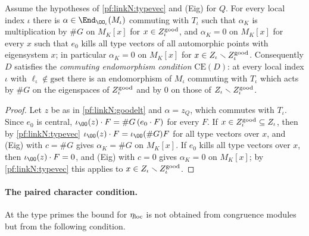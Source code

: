 \begin{proposition}\label{pf:linkN:operator}
Assume the hypotheses of \cref{pf:linkN:typevec} and (Eig) for $Q$. For every local index $\iota$ there is
$\alpha\in\End_{\OO_\iota}(M_\iota)$ commuting with $T_\iota$ such that $\alpha_K$ is multiplication by $\#G$ on $M_K[x]$ for
$x\in Z^{\mathrm{good}}_\iota$, and $\alpha_K=0$ on $M_K[x]$ for every $x$ such that $e_0$ kills all type vectors of all automorphic points
with eigensystem $x$; in particular $\alpha_K=0$ on $M_K[x]$ for $x\in Z_\iota\smallsetminus Z^{\mathrm{good}}_\iota$. Consequently $D$ satisfies
the \emph{commuting endomorphism condition} $\mathrm{CE}(D)$: at every local index $\iota$ with $\ell_\iota\notin\mathrm{gset}$
there is an endomorphism of $M_\iota$ commuting with $T_\iota$ which acts by $\#G$ on the eigenspaces of $Z^{\mathrm{good}}_\iota$ and by
$0$ on those of $Z_\iota\smallsetminus Z^{\mathrm{good}}_\iota$.
\end{proposition}

\begin{proof}
Let $z$ be as in \cref{pf:linkN:goodelt} and $\alpha=z_Q$, which commutes with $T_\iota$. Since $e_0$ is central,
$\iota_\OO(z)\cdot F=\#G\,(e_0\cdot F)$ for every $F$. If $x\in Z^{\mathrm{good}}_\iota\subseteq Z_\iota$, then by \cref{pf:linkN:typevec}
$\iota_\OO(z)\cdot F=\iota_\OO(\#G)F$ for all type vectors over $x$, and (Eig) with $c=\#G$ gives $\alpha_K=\#G$ on $M_K[x]$. If $e_0$
kills all type vectors over $x$, then $\iota_\OO(z)\cdot F=0$, and (Eig) with $c=0$ gives $\alpha_K=0$ on $M_K[x]$; by
\cref{pf:linkN:typevec} this applies to $x\in Z_\iota\smallsetminus Z^{\mathrm{good}}_\iota$.
\end{proof}

\paragraph{The paired character condition.}
At the type primes the bound for $\eta_{\mathrm{loc}}$ is not obtained from congruence modules but from the following condition.

